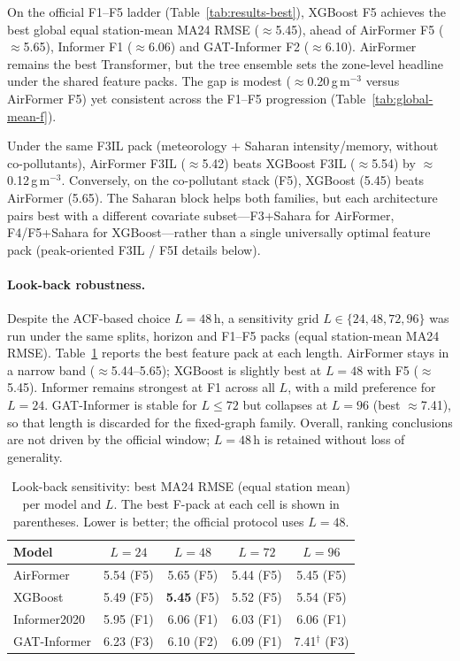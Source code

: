 \documentclass[11pt]{article}
\begin{document}
On the official F1--F5 ladder (Table~\ref{tab:results-best}), XGBoost F5 achieves the best global equal station-mean MA24 RMSE ($\approx$5.45), ahead of AirFormer F5 ($\approx$5.65), Informer F1 ($\approx$6.06) and GAT-Informer F2 ($\approx$6.10). AirFormer remains the best Transformer, but the tree ensemble sets the zone-level headline under the shared feature packs. The gap is modest ($\approx$0.20\,\textmu g\,m$^{-3}$ versus AirFormer F5) yet consistent across the F1--F5 progression (Table~\ref{tab:global-mean-f}).

Under the same F3IL pack (meteorology + Saharan intensity/memory, without co-pollutants), AirFormer F3IL ($\approx$5.42) beats XGBoost F3IL ($\approx$5.54) by $\approx$0.12\,\textmu g\,m$^{-3}$. Conversely, on the co-pollutant stack (F5), XGBoost (5.45) beats AirFormer (5.65). The Saharan block helps both families, but each architecture pairs best with a different covariate subset---F3+Sahara for AirFormer, F4/F5+Sahara for XGBoost---rather than a single universally optimal feature pack (peak-oriented F3IL / F5I details below).

\paragraph{Look-back robustness.}
Despite the ACF-based choice $L{=}48$\,h, a sensitivity grid $L\in\{24,48,72,96\}$ was run under the same splits, horizon and F1--F5 packs (equal station-mean MA24 RMSE). Table~\ref{tab:seqlen} reports the best feature pack at each length. AirFormer stays in a narrow band ($\approx$5.44--5.65); XGBoost is slightly best at $L{=}48$ with F5 ($\approx$5.45). Informer remains strongest at F1 across all $L$, with a mild preference for $L{=}24$. GAT-Informer is stable for $L{\le}72$ but collapses at $L{=}96$ (best $\approx$7.41), so that length is discarded for the fixed-graph family. Overall, ranking conclusions are not driven by the official window; $L{=}48$\,h is retained without loss of generality.

\begin{table}[H]
\centering
\caption{Look-back sensitivity: best MA24 RMSE (equal station mean) per model and $L$. The best F-pack at each cell is shown in parentheses. Lower is better; the official protocol uses $L{=}48$.}
\label{tab:seqlen}
\footnotesize
\begin{tabular}{@{}lcccc@{}}
\toprule
Model & $L{=}24$ & $L{=}48$ & $L{=}72$ & $L{=}96$ \\
\midrule
AirFormer & 5.54 (F5) & 5.65 (F5) & 5.44 (F5) & 5.45 (F5) \\
XGBoost & 5.49 (F5) & \textbf{5.45} (F5) & 5.52 (F5) & 5.54 (F5) \\
Informer2020 & 5.95 (F1) & 6.06 (F1) & 6.03 (F1) & 6.06 (F1) \\
GAT-Informer & 6.23 (F3) & 6.10 (F2) & 6.09 (F1) & 7.41$^\dagger$ (F3) \\
\bottomrule
\end{tabular}
\end{table}
\end{document}
